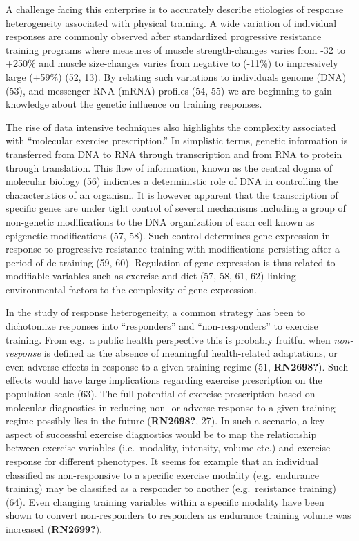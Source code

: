 \documentclass[twoside,10pt]{gihclass} %
\begin{document}
A challenge facing this enterprise is to accurately describe etiologies of response heterogeneity associated with physical training. A wide variation of individual responses are commonly observed after standardized progressive resistance training programs where measures of muscle strength-changes varies from -32 to +250\% and muscle size-changes varies from negative to (-11\%) to impressively large (+59\%)
(52, 13).
By relating such variations to individuals genome (DNA)
(53),
and messenger RNA (mRNA) profiles
(54, 55)
we are beginning to gain knowledge about the genetic influence on training responses.

The rise of data intensive techniques also highlights the complexity associated with ``molecular exercise prescription.'' In simplistic terms, genetic information is transferred from DNA to RNA through transcription and from RNA to protein through translation. This flow of information, known as the central dogma of molecular biology
(56)
indicates a deterministic role of DNA in controlling the characteristics of an organism. It is however apparent that the transcription of specific genes are under tight control of several mechanisms including a group of non-genetic modifications to the DNA organization of each cell known as epigenetic modifications
(57, 58).
Such control determines gene expression in response to progressive resistance training with modifications persisting after a period of de-training
(59, 60).
Regulation of gene expression is thus related to modifiable variables such as exercise and diet
(57, 58, 61, 62)
linking environmental factors to the complexity of gene expression.

In the study of response heterogeneity, a common strategy has been to dichotomize responses into ``responders'' and ``non-responders'' to exercise training. From e.g.~a public health perspective this is probably fruitful when \emph{non-response} is defined as the absence of meaningful health-related adaptations, or even adverse effects in response to a given training regime
(51, \textbf{RN2698?}).
Such effects would have large implications regarding exercise prescription on the population scale
(63).
The full potential of exercise prescription based on molecular diagnostics in reducing non- or adverse-response to a given training regime possibly lies in the future
(\textbf{RN2698?}, 27).
In such a scenario, a key aspect of successful exercise diagnostics would be to map the relationship between exercise variables (i.e.~modality, intensity, volume etc.) and exercise response for different phenotypes.
It seems for example that an individual classified as non-responsive to a specific exercise modality (e.g.~endurance training) may be classified as a responder to another (e.g.~resistance training)
(64).
Even changing training variables within a specific modality have been shown to convert non-responders to responders as endurance training volume was increased
(\textbf{RN2699?}).
\end{document}
